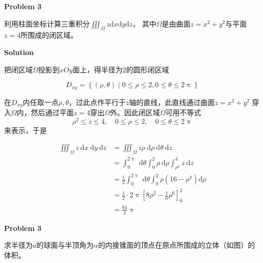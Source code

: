 \documentclass[12pt, a4paper]{article}
\numberwithin{equation}{section}
\newcommand{\rmd}{\mathrm{d}}
\begin{document}
    \textbf{Problem 3}
    \vspace{1em}

    利用柱面坐标计算三重积分${\displaystyle \iiint_\varOmega z \rmd x \rmd y \rmd z}$，
    其中$\varOmega$是由曲面$z=x^2+y^2$与平面\(z=4\)所围成的闭区域。
    \vspace{1em}

    \textbf{Solution}
    \vspace{1em}

    把闭区域\(\varOmega\)投影到\(xOy\)面上，得半径为2的圆形闭区域

    $$
    D_{x y}=\left\{(\rho, \theta) \mid 0 \leq \rho \leq 2, 0 \leq \theta \leq 2 \uppi \right\}
    $$

    在\(D_{xy}\)内任取一点\(\rho, \theta\)，过此点作平行于\(z \)轴的直线，此直线通过曲面$z=x^2+y^2$
    穿入\(\varOmega\)内，然后通过平面\(z=4\)穿出\(\varOmega\)外。因此闭区域\(\varOmega\)可用不等式
    \[\rho^2 \leq z \leq 4, \quad 0 \leq \rho \leq 2, \quad 0 \leq \theta \leq 2 \uppi\]
    来表示，于是

    $$
        \begin{aligned}
            \iiint_\varOmega z \mathrm{~d} x \mathrm{~d} y \mathrm{~d} z
            & =\iiint_\varOmega z \rho \mathrm{~d} \rho \mathrm{~d} \theta \mathrm{~d} z \\
            & =\int_0^{2 \uppi} \mathrm{~d} \theta \int_0^2 \rho \mathrm{~d} \rho \int_{\rho^2}^4 z \mathrm{~d} z \\
            & =\frac{1}{2} \int_0^{2 \uppi} \mathrm{~d} \theta \int_0^2 \rho\left(16-\rho^4\right) \mathrm{d} \rho \\
            & =\frac{1}{2} \cdot 2 \uppi\left[8 \rho^2-\frac{1}{6} \rho^6\right]_0^2 \\
            & =\frac{64}{3} \uppi
        \end{aligned}
    $$

    \textbf{Problem 3}
    \vspace{1em}

    求半径为\(a \)的球面与半顶角为\(\alpha\)的内接锥面的顶点在原点所围成的立体（如图）的体积。
\end{document}

